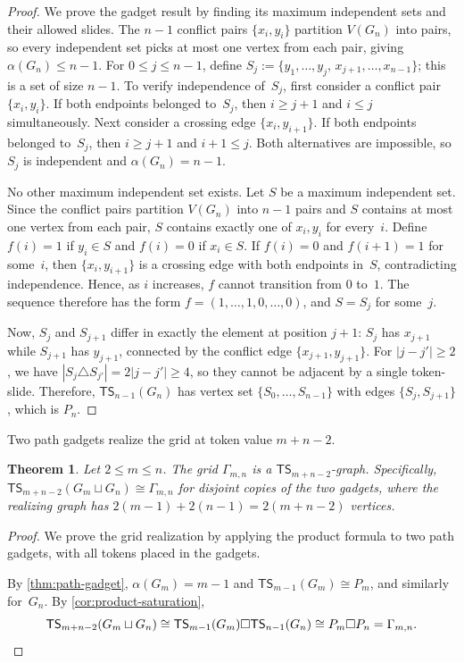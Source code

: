 \documentclass[a4paper]{article}
\theoremstyle{plain}
\newtheorem{theorem}{Theorem}[section]
\theoremstyle{definition}
\newcommand{\TSsym}{\mathsf{TS}}
\numberwithin{equation}{section}
\begin{document}
\begin{proof}
We prove the gadget result by finding its maximum independent sets and their allowed slides.
The $n-1$ conflict pairs $\{x_i,y_i\}$ partition $V(G_n)$ into pairs, so every independent set picks at most one vertex from each pair, giving $\alpha(G_n)\le n-1$.
For $0\le j\le n-1$, define $S_j:=\{y_1,\dots,y_j,\,x_{j+1},\dots,x_{n-1}\}$; this is a set of size $n-1$.
To verify independence of~$S_j$, first consider a conflict pair $\{x_i,y_i\}$.
If both endpoints belonged to~$S_j$, then $i\ge j+1$ and $i\le j$ simultaneously.
Next consider a crossing edge $\{x_i,y_{i+1}\}$.
If both endpoints belonged to~$S_j$, then $i\ge j+1$ and $i+1\le j$.
Both alternatives are impossible, so $S_j$ is independent and $\alpha(G_n)=n-1$.

No other maximum independent set exists.
Let $S$ be a maximum independent set.
Since the conflict pairs partition $V(G_n)$ into $n-1$ pairs and $S$ contains at most one vertex from each pair, $S$ contains exactly one of $x_i,y_i$ for every~$i$.
Define $f(i)=1$ if $y_i\in S$ and $f(i)=0$ if $x_i\in S$.
If $f(i)=0$ and $f(i+1)=1$ for some~$i$, then $\{x_i,y_{i+1}\}$ is a crossing edge with both endpoints in~$S$, contradicting independence.
Hence, as $i$ increases, $f$ cannot transition from $0$ to~$1$.
The sequence therefore has the form $f=(1,\dots,1,0,\dots,0)$, and $S=S_j$ for some~$j$.

Now, $S_j$ and $S_{j+1}$ differ in exactly the element at position $j+1$: $S_j$ has $x_{j+1}$ while $S_{j+1}$ has $y_{j+1}$, connected by the conflict edge $\{x_{j+1},y_{j+1}\}$.
For $|j-j'|\ge 2$, we have $|S_j\triangle S_{j'}|=2|j-j'|\ge 4$, so they cannot be adjacent by a single token-slide.
Therefore, $\TSsym_{n-1}(G_n)$ has vertex set $\{S_0,\dots,S_{n-1}\}$ with edges $\{S_j,S_{j+1}\}$, which is $P_n$.
\end{proof}

Two path gadgets realize the grid at token value $m+n-2$.

\begin{theorem}
\label{thm:grid-realizability}
Let $2\le m\le n$.
The grid $\Gamma_{m,n}$ is a $\TSsym_{m+n-2}$-graph.
Specifically, $\TSsym_{m+n-2}(G_m\sqcup G_n)\cong \Gamma_{m,n}$ for disjoint copies of the two gadgets, where the realizing graph has $2(m-1)+2(n-1)=2(m+n-2)$ vertices.
\end{theorem}

\begin{proof}
We prove the grid realization by applying the product formula to two path gadgets, with all tokens placed in the gadgets.

By \cref{thm:path-gadget}, $\alpha(G_m)=m-1$ and $\TSsym_{m-1}(G_m)\cong P_m$, and similarly for~$G_n$.
By \cref{cor:product-saturation},
\[
\TSsym_{m+n-2}(G_m\sqcup G_n)\cong \TSsym_{m-1}(G_m)\square \TSsym_{n-1}(G_n)\cong P_m\square P_n=\Gamma_{m,n}.\qedhere
\]
\end{proof}
\end{document}
